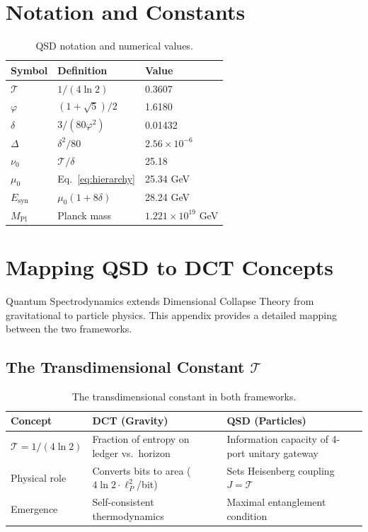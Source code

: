 \documentclass[11pt,a4paper]{article}
\theoremstyle{definition}
\newcommand{\Tc}{\mathcal{T}}           %
\newcommand{\dgeo}{\delta}              %
\newcommand{\Dgap}{\Delta}              %
\newcommand{\nurad}{\nu_0}              %
\newcommand{\murad}{\mu_0}              %
\newcommand{\Esyn}{E_{\text{syn}}}      %
\newcommand{\Mpl}{M_{\text{Pl}}}        %
\begin{document}

\appendix

\section{Notation and Constants}
\label{app:notation}

\begin{table}[h]
\centering
\begin{tabular}{lll}
\toprule
\textbf{Symbol} & \textbf{Definition} & \textbf{Value} \\
\midrule
$\Tc$ & $1/(4\ln 2)$ & 0.3607 \\
$\varphi$ & $(1+\sqrt{5})/2$ & 1.6180 \\
$\dgeo$ & $3/(80\varphi^2)$ & 0.01432 \\
$\Dgap$ & $\dgeo^2/80$ & $2.56 \times 10^{-6}$ \\
$\nurad$ & $\Tc/\dgeo$ & 25.18 \\
$\murad$ & Eq.~\eqref{eq:hierarchy} & 25.34 GeV \\
$\Esyn$ & $\murad(1+8\dgeo)$ & 28.24 GeV \\
$\Mpl$ & Planck mass & $1.221 \times 10^{19}$ GeV \\
\bottomrule
\end{tabular}
\caption{QSD notation and numerical values.}
\end{table}

\section{Mapping QSD to DCT Concepts}
\label{app:dct}

Quantum Spectrodynamics extends Dimensional Collapse Theory from gravitational to particle physics. This appendix provides a detailed mapping between the two frameworks.

\subsection{The Transdimensional Constant $\Tc$}

\begin{table}[h]
\centering
\begin{tabular}{p{4cm}p{5cm}p{5cm}}
\toprule
\textbf{Concept} & \textbf{DCT (Gravity)} & \textbf{QSD (Particles)} \\
\midrule
$\Tc = 1/(4\ln 2)$ & Fraction of entropy on ledger vs.\ horizon & Information capacity of 4-port unitary gateway \\
Physical role & Converts bits to area ($4\ln 2 \cdot \ell_P^2$/bit) & Sets Heisenberg coupling $J = \Tc$ \\
Emergence & Self-consistent thermodynamics & Maximal entanglement condition \\
\bottomrule
\end{tabular}
\caption{The transdimensional constant in both frameworks.}
\end{table}
\end{document}
